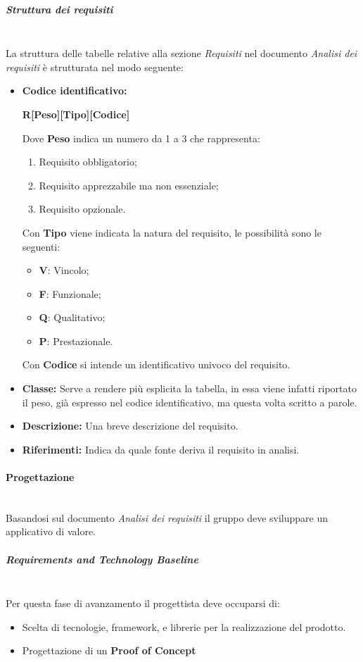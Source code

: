 \subparagraph{Struttura dei requisiti}
\mbox{} \\
La struttura delle tabelle relative alla sezione \textit{Requisiti} nel documento \textit{Analisi dei requisiti} è strutturata nel modo seguente:
\begin{itemize}
    \item   \textbf{Codice identificativo:}
            \par \centerline{\textbf{R[Peso][Tipo][Codice]}}
            Dove \textbf{Peso} indica un numero da 1 a 3 che rappresenta:
            \begin{enumerate}
                \item Requisito obbligatorio;
                \item Requisito apprezzabile ma non essenziale;
                \item Requisito opzionale.
            \end{enumerate}
            Con \textbf{Tipo} viene indicata la natura del requisito, le possibilità sono le seguenti:
            \begin{itemize}
                \item \textbf{V}: Vincolo;
                \item \textbf{F}: Funzionale;
                \item \textbf{Q}: Qualitativo;
                \item \textbf{P}: Prestazionale.
            \end{itemize}
            Con \textbf{Codice} si intende un identificativo univoco del requisito.
    \item \textbf{Classe:} Serve a rendere più esplicita la tabella, in essa viene infatti riportato il peso, già espresso nel codice identificativo, ma questa volta scritto a parole.
    \item \textbf{Descrizione:} Una breve descrizione del requisito.
    \item \textbf{Riferimenti:} Indica da quale fonte deriva il requisito in analisi.   
\end{itemize}

\paragraph{Progettazione}
\mbox{} \\
Basandosi sul documento \textit{Analisi dei requisiti} il gruppo deve sviluppare
un applicativo di valore.

\subparagraph{Requirements and Technology Baseline}
\mbox{} \\
Per questa fase di avanzamento il progettista deve occuparsi di:
\begin{itemize}
    \item Scelta di tecnologie, framework, e librerie per la realizzazione del prodotto.
    \item Progettazione di un \textbf{Proof of Concept}
\end{itemize}


